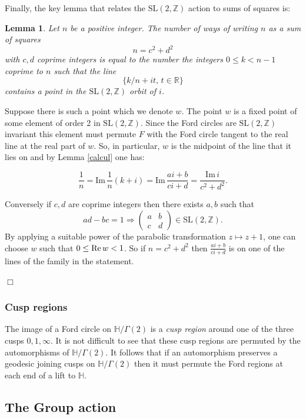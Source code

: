 \documentclass[12pt,a4paper]{amsart}
\newtheorem{lem}[thm]{Lemma}
\def\HH{\mathbb{H}}
\def\im{\mathrm{Im}\,}
\def\xx{\HH/g2}
\def\ZZ{\mathbb{Z}}
\def\RR{\mathbb{R}}
\def\sl2{\mathrm{SL}(2, \ZZ)}
\def\g2{\Gamma(2)}
\def\xx{\HH/\g2}
\begin{document}
Finally, the key lemma that relates the $\sl2$ action to sums of squares is:

\begin{lem} \label{squares}
Let $n$ be a positive integer.
The number of  ways of writing $n$  as a  sum of squares
$$n = c^2 + d^2$$
with $c,d$ coprime integers
is equal to the number the  integers $0 \leq k < n-1$ coprime to $n$
such that the line
$$\{  k/n + i t,\, t \in \RR \}$$
contains  a point in the $\sl2$  orbit of $i$.
\end{lem}


\proof  Suppose there is such  a point which we denote  $w$.
The point $w$ is a fixed point of some  element of order 2 in $\sl2$.
Since the Ford circles are $\sl2$ invariant
this element must permute $F$ with the Ford circle tangent 
to the real line  at the real part of $w$.
So, in particular, $w$ is the midpoint of the line 
that it lies on 
and by  Lemma \ref{calcul} one has:

$$\frac{1}{n} = \im \frac{1 }{n}(k + i)  
= \im  \frac{ai +b}{ci+d }
= \frac{\im i} {c^2 + d^2}.$$

Conversely if $c,d$ are coprime integers 
 then there exists $a,b$ such that
 $$ad - bc = 1 \Rightarrow  
 \begin{pmatrix}
 a & b \\
 c & d
 \end{pmatrix} \in \sl2.
$$
By applying a suitable power of the parabolic transformation 
$z \mapsto z + 1$,
one can choose $w$ such that $0 \leq \text{Re\,} w < 1$.
So if $n = c^2 + d^2$ then $\frac{ai +b}{ci+d }$
is on one of the lines of the family in the statement.

\hfill $\Box$

\subsubsection{Cusp regions}

The image of a Ford circle on $\xx$ is a \textit{cusp region}
around one of the three cusps $0,1,\infty$.
It is not difficult to see that these cusp regions 
are permuted by the automorphisms of $\xx$.
It follows that if an automorphism preserves a geodesic  joining cusps on $\xx$
then it must permute the Ford regions at each end of a lift to $\HH$.

\subsection{The Group action}
\end{document}
